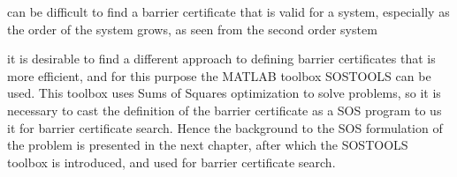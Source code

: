 can be difficult to find a barrier certificate that is valid for a system, especially as the order of the system grows, as seen from the second order system

it is desirable to find a different approach to defining barrier certificates that is more efficient, and for this purpose the MATLAB toolbox SOSTOOLS can be used. This toolbox uses Sums of Squares optimization to solve problems, so it is necessary to cast the definition of the barrier certificate as a SOS program to us it for barrier certificate search. Hence the background to the SOS  formulation of the problem is presented in the next chapter, after which the SOSTOOLS toolbox is introduced, and used for barrier certificate search.